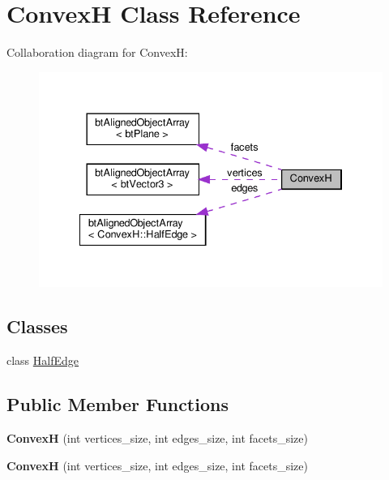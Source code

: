 \hypertarget{classConvexH}{}\section{ConvexH Class Reference}
\label{classConvexH}


Collaboration diagram for ConvexH\+:
\nopagebreak
\begin{figure}[H]
\begin{center}
\leavevmode
\includegraphics[width=334pt]{classConvexH__coll__graph}
\end{center}
\end{figure}
\subsection*{Classes}
\begin{DoxyCompactItemize}
\item 
class \hyperlink{classConvexH_1_1HalfEdge}{Half\+Edge}
\end{DoxyCompactItemize}
\subsection*{Public Member Functions}
\begin{DoxyCompactItemize}
\item 
\mbox{\label{classConvexH_a6eb50c88208f9acfcbeccdda32d4d516}} 
{\bfseries ConvexH} (int vertices\+\_\+size, int edges\+\_\+size, int facets\+\_\+size)
\item 
\mbox{\label{classConvexH_a6eb50c88208f9acfcbeccdda32d4d516}} 
{\bfseries ConvexH} (int vertices\+\_\+size, int edges\+\_\+size, int facets\+\_\+size)
\end{DoxyCompactItemize}
